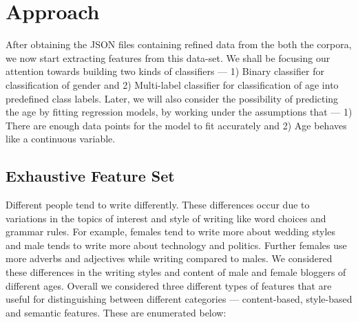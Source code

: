 \documentclass{sig-alternate}
\begin{document}
\section{Approach}
After obtaining the JSON files containing refined data from the both the corpora, we now start extracting features from this data-set. We shall be focusing our attention towards building two kinds of classifiers --- 1) Binary classifier for classification of gender and 2) Multi-label classifier for classification of age into predefined class labels. Later, we will also consider the possibility of predicting the age by fitting regression models, by working under the assumptions that --- 1) There are enough data points for the model to fit accurately and 2) Age behaves like a continuous variable. 

\subsection{Exhaustive Feature Set}
Different  people  tend  to  write  differently.  These  differences  occur  due  to  variations in the topics of interest and style of writing like word choices and grammar rules. For example, females tend to write more about wedding styles and male tends to write more
about technology and politics. Further females use more adverbs and adjectives while
writing compared to males. We considered these differences in the writing styles
and content of male and female bloggers of different ages. Overall we considered three
different types of features that are useful for distinguishing between different categories
--- content-based, style-based and semantic features. These are enumerated below:
\end{document}
